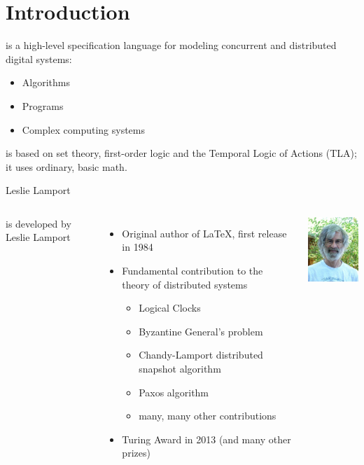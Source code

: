 \section[image=bgphoto_cut]{Introduction}
\begin{frame}[plain]{}
    \sectionpage
\end{frame}

\begin{frame}{\tlap}
    \tlap is a high-level specification language for modeling concurrent and distributed digital systems:
    \begin{itemize}
        \item Algorithms
        \item Programs
        \item Complex computing systems
    \end{itemize}

    \tlap is based on set theory, first-order logic and the Temporal Logic of Actions (TLA); it uses ordinary, basic math.
\end{frame}

\begin{frame}{Leslie Lamport}
    \begin{columns}[onlytextwidth,T]
        \column{\dimexpr\linewidth-30mm-5mm}
        \tlap is developed by Leslie Lamport
        \begin{itemize}
            \item Original author of \LaTeX, first release in 1984
            \item Fundamental contribution to the theory of distributed systems
            \begin{itemize}
                \item Logical Clocks
                \item Byzantine General's problem
                \item Chandy-Lamport distributed snapshot algorithm
                \item Paxos algorithm
                \item many, many other contributions
            \end{itemize}
            \item Turing Award in 2013 (and many other prizes)
        \end{itemize}

        \column{30mm}
        \includegraphics[width=3cm]{images/Leslie_Lamport.jpg}
    \end{columns}
\end{frame}

